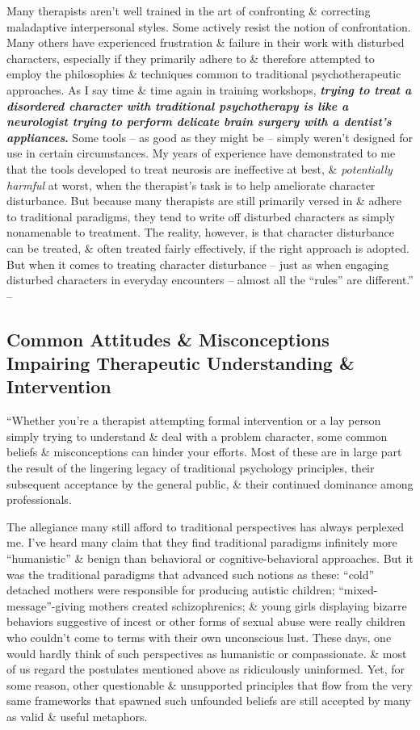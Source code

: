 \documentclass{article}
\numberwithin{equation}{section}
\begin{document}
Many therapists aren't well trained in the art of confronting \& correcting maladaptive interpersonal styles. Some actively resist the notion of confrontation. Many others have experienced frustration \& failure in their work with disturbed characters, especially if they primarily adhere to \& therefore attempted to employ the philosophies \& techniques common to traditional psychotherapeutic approaches. As I say time \& time again in training workshops, \textbf{\textit{trying to treat a disordered character with traditional psychotherapy is like a neurologist trying to perform delicate brain surgery with a dentist's appliances}.} Some tools -- as good as they might be -- simply weren't designed for use in certain circumstances. My years of experience have demonstrated to me that the tools developed to treat neurosis are ineffective at best, \& \textit{potentially harmful} at worst, when the therapist's task is to help ameliorate character disturbance. But because many therapists are still primarily versed in \& adhere to traditional paradigms, they tend to write off disturbed characters as simply nonamenable to treatment. The reality, however, is that character disturbance can be treated, \& often treated fairly effectively, if the right approach is adopted. But when it comes to treating character disturbance -- just as when engaging disturbed characters in everyday encounters -- almost all the ``rules'' are different.'' -- \cite[pp. 188--189]{Simon2011}

\subsection{Common Attitudes \& Misconceptions Impairing Therapeutic Understanding \& Intervention}
``Whether you're a therapist attempting formal intervention or a lay person simply trying to understand \& deal with a problem character, some common beliefs \& misconceptions can hinder your efforts. Most of these are in large part the result of the lingering legacy of traditional psychology principles, their subsequent acceptance by the general public, \& their continued dominance among professionals.

The allegiance many still afford to traditional perspectives has always perplexed me. I've heard many claim that they find traditional paradigms infinitely more ``humanistic'' \& benign than behavioral or cognitive-behavioral approaches. But it was the traditional paradigms that advanced such notions as these: ``cold'' detached mothers were responsible for producing autistic children; ``mixed-message''-giving mothers created schizophrenics; \& young girls displaying bizarre behaviors suggestive of incest or other forms of sexual abuse were really children who couldn't come to terms with their own unconscious lust. These days, one would hardly think of such perspectives as humanistic or compassionate. \& most of us regard the postulates mentioned above as ridiculously uninformed. Yet, for some reason, other questionable \& unsupported principles that flow from the very same frameworks that spawned such unfounded beliefs are still accepted by many as valid \& useful metaphors.
\end{document}
